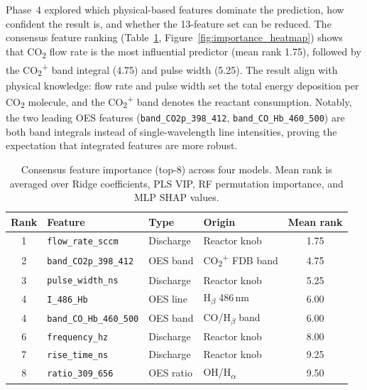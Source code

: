 \documentclass[12pt, a4paper]{article}
\begin{document}
Phase~4 explored which physical-based features dominate the prediction, how confident the result is, and whether the 13-feature set can be reduced. The consensus feature ranking (Table~\ref{tab:feature_importance}, Figure~\ref{fig:importance_heatmap}) shows that CO\textsubscript{2} flow rate is the most influential predictor (mean rank 1.75), followed by the CO\textsubscript{2}\textsuperscript{+} band integral (4.75) and pulse width (5.25). The result align with physical knowledge: flow rate and pulse width set the total energy deposition per CO\textsubscript{2} molecule, and the CO\textsubscript{2}\textsuperscript{+} band denotes the reactant consumption. Notably, the two leading OES features (\texttt{band\_CO2p\_398\_412}, \texttt{band\_CO\_Hb\_460\_500}) are both band integrals instead of single-wavelength line intensities, proving the expectation that integrated features are more robust.

\begin{table}[H]
    \centering
    \small
    \caption{Consensus feature importance (top-8) across four models. Mean rank is averaged over Ridge coefficients, PLS VIP, RF permutation importance, and MLP SHAP values.}
    \label{tab:feature_importance}
    \begin{tabular}{clll c}
        \toprule
        \textbf{Rank} & \textbf{Feature} & \textbf{Type} & \textbf{Origin} & \textbf{Mean rank} \\
        \midrule
        1 & \texttt{flow\_rate\_sccm}       & Discharge & Reactor knob & 1.75 \\
        2 & \texttt{band\_CO2p\_398\_412}   & OES band  & CO\textsubscript{2}\textsuperscript{+} FDB band & 4.75 \\
        3 & \texttt{pulse\_width\_ns}       & Discharge & Reactor knob & 5.25 \\
        4 & \texttt{I\_486\_Hb}             & OES line  & H\textsubscript{$\beta$} 486\,nm & 6.00 \\
        4 & \texttt{band\_CO\_Hb\_460\_500} & OES band  & CO/H\textsubscript{$\beta$} band & 6.00 \\
        6 & \texttt{frequency\_hz}          & Discharge & Reactor knob & 8.00 \\
        7 & \texttt{rise\_time\_ns}         & Discharge & Reactor knob & 9.25 \\
        8 & \texttt{ratio\_309\_656}        & OES ratio & OH/H\textsubscript{$\alpha$} & 9.50 \\
        \bottomrule
    \end{tabular}
\end{table}
\end{document}
